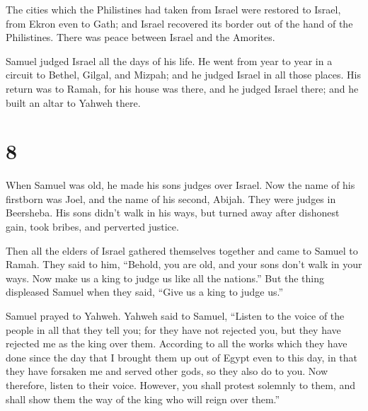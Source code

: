  The cities which the Philistines had taken from Israel
were restored to Israel, from Ekron even to Gath; and Israel recovered
its border out of the hand of the Philistines. There was peace between
Israel and the Amorites.

 Samuel judged Israel all the days of his life.
 He went from year to year in a circuit to Bethel, Gilgal,
and Mizpah; and he judged Israel in all those places.  His
return was to Ramah, for his house was there, and he judged Israel
there; and he built an altar to Yahweh there.

\hypertarget{section-7}{%
\section{8}\label{section-7}}

 When Samuel was old, he made his sons judges over Israel.
 Now the name of his firstborn was Joel, and the name of his
second, Abijah. They were judges in Beersheba.  His sons
didn't walk in his ways, but turned away after dishonest gain, took
bribes, and perverted justice.

 Then all the elders of Israel gathered themselves together
and came to Samuel to Ramah.  They said to him, ``Behold,
you are old, and your sons don't walk in your ways. Now make us a king
to judge us like all the nations.''  But the thing
displeased Samuel when they said, ``Give us a king to judge us.''

Samuel prayed to Yahweh.  Yahweh said to Samuel, ``Listen to
the voice of the people in all that they tell you; for they have not
rejected you, but they have rejected me as the king over them.
 According to all the works which they have done since the
day that I brought them up out of Egypt even to this day, in that they
have forsaken me and served other gods, so they also do to you.
 Now therefore, listen to their voice. However, you shall
protest solemnly to them, and shall show them the way of the king who
will reign over them.''


